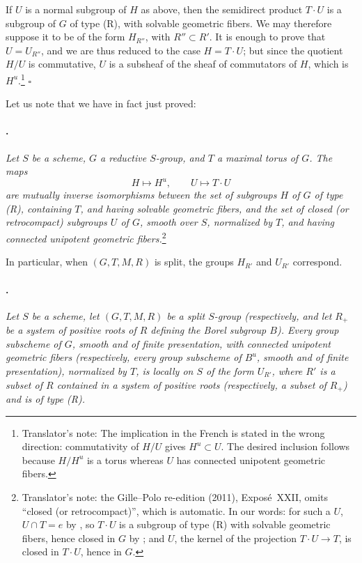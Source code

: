 If \(U\) is a normal
subgroup of \(H\) as above, then the semidirect product \(T\cdot U\)
is a subgroup of \(G\) of type \textup{(R)}, with solvable
geometric fibers. We may therefore suppose it to be of the form
\(H_{R''}\), with \(R''\subset R'\). It is enough to prove that
\(U=U_{R''}\), and we are thus reduced to the case
\(H=T\cdot U\); but since the quotient \(H/U\) is commutative,
\(U\) is a subsheaf of the sheaf of commutators of \(H\),
which is \(H^u\).\footnote{Translator's note: The implication in the
French is stated in the wrong direction: commutativity of \(H/U\)
gives \(H^u\subset U\). The desired inclusion follows because
\(H/H^u\) is a torus whereas \(U\) has connected unipotent
geometric fibers.}
\hfill\(\square\)

Let us note that we have in fact just proved:

\paragraph{.}
\textit{Let \(S\) be a scheme, \(G\) a reductive \(S\)-group, and
\(T\) a maximal torus of \(G\). The maps}
\[
  H\longmapsto H^u,
  \qquad
  U\longmapsto T\cdot U
\]
\textit{are mutually inverse isomorphisms between the set of subgroups
\(H\) of \(G\) of type \textup{(R)}, containing \(T\), and having
solvable geometric fibers, and the set of closed \textup{(or
retrocompact)} subgroups \(U\) of \(G\), smooth over \(S\), normalized
by \(T\), and having connected unipotent geometric fibers.}\footnote{Translator's note: the Gille--Polo re-edition (2011), Exposé~XXII,
omits ``closed (or retrocompact)'', which is automatic. In our words: for such
a \(U\), \(U\cap T=e\) by , so \(T\cdot U\) is a subgroup of type \textup{(R)}
with solvable geometric fibers, hence closed in \(G\) by ; and \(U\),
the kernel of the projection \(T\cdot U\to T\), is closed in \(T\cdot U\),
hence in \(G\).}

In particular, when \((G,T,M,R)\) is split, the groups \(H_{R'}\)
and \(U_{R'}\) correspond.

\paragraph{.}
\textit{Let \(S\) be a scheme, let \((G,T,M,R)\) be a split
\(S\)-group \textup{(respectively, and let \(R_+\) be a system of
positive roots of \(R\) defining the Borel subgroup \(B\))}.
Every group subscheme of \(G\), smooth and of finite presentation,
with connected unipotent geometric fibers \textup{(respectively, every
group subscheme of \(B^u\), smooth and of finite presentation)},
normalized by \(T\), is locally on \(S\) of the form
\(U_{R'}\), where \(R'\) is a subset of \(R\) contained in a system
of positive roots \textup{(respectively, a subset of \(R_+\))} and
is of type \textup{(R)}.}


